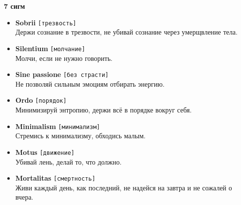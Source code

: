 \documentclass[12pt]{article}
\begin{document}
\begin{center}
	{\Huge\textbf{7 сигм}}
\end{center}
\hrulefill

\begin{itemize}
	\item {\bf Sobrii} \texttt{[трезвость]}\\
	Держи сознание в трезвости, не убивай сознание через умерщвление тела.

	\item {\bf Silentium} \texttt{[молчание]}\\
	Молчи, если не нужно говорить.

	\item {\bf Sine passione} \texttt{[без страсти]}\\
	Не позволяй сильным эмоциям отбирать энергию.

	\item {\bf Ordo} \texttt{[порядок]}\\
	Минимизируй энтропию, держи всё в порядке вокруг себя.

	\item {\bf Minimalism} \texttt{[минимализм]}\\
	Стремись к минимализму, обходись малым.

	\item {\bf Motus} \texttt{[движение]}\\
	Убивай лень, делай то, что должно.
	
	\item {\bf Mortalitas} \texttt{[смертность]}\\
	Живи каждый день, как последний, не надейся на завтра и не сожалей о вчера.
\end{itemize}
\end{document}

